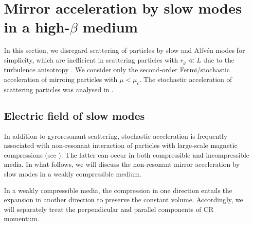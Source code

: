 \documentclass[preprint2,twocolumn,times,tighten]{aastex63}
\newcommand*{\xu}{\color{magenta}}
\begin{document}
\section{Mirror acceleration by slow modes in a high-$\beta$ medium}

In this section, we disregard scattering of particles by slow and Alfv\'{e}n modes for simplicity, 
which are inefficient in 
scattering particles with 
$r_g \ll L$
due to the turbulence anisotropy
\citep{Chan00,YL02,XL20}. 
We consider only the second-order Fermi/stochastic acceleration of mirroing particles with $\mu<\mu_c$. The stochastic acceleration of scattering particles was analysed in \citet{CL06}. 




\subsection{Electric field of slow modes}

{In addition to gyroresonant scattering, 
stochastic acceleration is frequently associated with 
non-resonant interaction of particles with large-scale magnetic compressions
(see \citealt{CL06}).} 
 The latter can occur in both compressible and incompressible media. 
In what follows, we will discuss the {non-resonant mirror acceleration} by slow modes in a weakly compressible medium. 
 
 In a weakly compressible media, the compression in one direction entails the expansion in {another} direction to 
 preserve the constant volume. 
{Accordingly, we will separately treat the perpendicular and parallel components of CR momentum.} 
 
\end{document}
